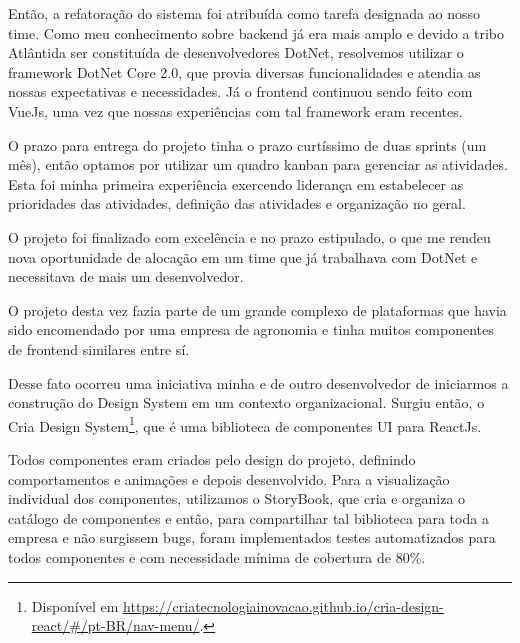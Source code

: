 Então, a refatoração do sistema foi atribuída como tarefa designada ao nosso time.
Como meu conhecimento sobre backend já era mais amplo e devido a tribo Atlântida ser constituída de desenvolvedores DotNet, resolvemos utilizar o framework DotNet Core 2.0, que 
provia diversas funcionalidades e atendia as nossas expectativas e necessidades.
Já o frontend continuou sendo feito com VueJs, uma vez que nossas experiências com tal framework eram recentes.

O prazo para entrega do projeto tinha o prazo curtíssimo de duas sprints (um mês), então optamos por utilizar um quadro kanban para gerenciar as atividades.
Esta foi minha primeira experiência exercendo liderança em estabelecer as prioridades das atividades, definição das atividades e organização no geral.

O projeto foi finalizado com excelência e no prazo estipulado, o que me rendeu nova oportunidade de alocação em um time que já trabalhava com DotNet e necessitava de mais um desenvolvedor.

O projeto desta vez fazia parte de um grande complexo de plataformas que havia sido encomendado por uma empresa de agronomia e tinha muitos componentes de frontend similares entre sí.

Desse fato ocorreu uma iniciativa minha e de outro desenvolvedor de iniciarmos a construção do Design System em um contexto organizacional.
Surgiu então, o Cria Design System\footnote{Disponível em \url{https://criatecnologiainovacao.github.io/cria-design-react/#/pt-BR/nav-menu/}.}, que é uma biblioteca de componentes UI para ReactJs.

Todos componentes eram criados pelo design do projeto, definindo comportamentos e animações e depois desenvolvido. Para a visualização individual dos componentes, utilizamos o StoryBook,
que cria e organiza o catálogo de componentes e então, para compartilhar tal biblioteca para toda a empresa e não surgissem bugs, foram implementados testes automatizados para todos componentes e com necessidade mínima de cobertura de 80\%.

